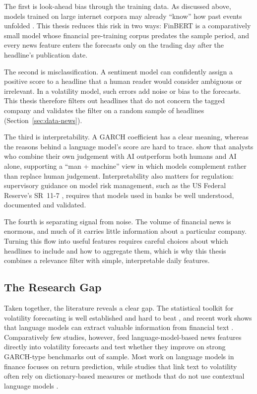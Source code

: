 The first is look-ahead bias through the training data. As discussed above, models trained on large internet corpora may already ``know'' how past events unfolded \parencite{lopezlira2023}. This thesis reduces this risk in two ways: FinBERT is a comparatively small model whose financial pre-training corpus predates the sample period, and every news feature enters the forecasts only on the trading day after the headline's publication date.

The second is misclassification. A sentiment model can confidently assign a positive score to a headline that a human reader would consider ambiguous or irrelevant. In a volatility model, such errors add noise or bias to the forecasts. This thesis therefore filters out headlines that do not concern the tagged company and validates the filter on a random sample of headlines (Section~\ref{sec:data-news}).

The third is interpretability. A GARCH coefficient has a clear meaning, whereas the reasons behind a language model's score are hard to trace. \textcite{cao2024} show that analysts who combine their own judgement with AI outperform both humans and AI alone, supporting a ``man + machine'' view in which models complement rather than replace human judgement. Interpretability also matters for regulation: supervisory guidance on model risk management, such as the US Federal Reserve's SR~11-7 \parencite{federalreserve2011}, requires that models used in banks be well understood, documented and validated.

The fourth is separating signal from noise. The volume of financial news is enormous, and much of it carries little information about a particular company. Turning this flow into useful features requires careful choices about which headlines to include and how to aggregate them, which is why this thesis combines a relevance filter with simple, interpretable daily features.

\subsection{The Research Gap}\label{sec:lit-gap}
Taken together, the literature reveals a clear gap. The statistical toolkit for volatility forecasting is well established and hard to beat \parencite{engle1982,bollerslev1986,hansen2005}, and recent work shows that language models can extract valuable information from financial text \parencite{wu2023,lopezlira2023}. Comparatively few studies, however, feed language-model-based news features directly into volatility forecasts and test whether they improve on strong GARCH-type benchmarks out of sample. Most work on language models in finance focuses on return prediction, while studies that link text to volatility often rely on dictionary-based measures \parencite{loughran2011} or methods that do not use contextual language models \parencite{ke2019}.

